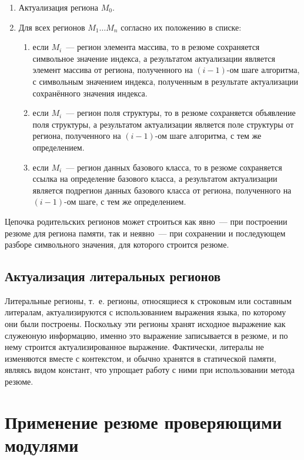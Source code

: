 \begin{enumerate}
 \item Актуализация региона $M_0$.
 \item Для всех регионов $M_1 \ldots M_n$ согласно их положению в списке:
 \begin{enumerate}
  \item если $M_i$~--- регион элемента массива, то в резюме сохраняется символьное значение индекса, а результатом актуализации является элемент массива от региона, полученного на $(i-1)$-ом шаге алгоритма, с символьным значением индекса, полученным в результате актуализации сохранённого значения индекса.
  \item если $M_i$~--- регион поля структуры, то в резюме сохраняется объявление поля структуры, а результатом актуализации является поле структуры от региона, полученного на $(i-1)$-ом шаге алгоритма, с тем же определением.
  \item если $M_i$~--- регион данных базового класса, то в резюме сохраняется ссылка на определение базового класса, а результатом актуализации является подрегион данных базового класса от региона, полученного на $(i-1)$-ом шаге, с тем же определением.
 \end{enumerate}
\end{enumerate}

Цепочка родительских регионов может строиться как явно~--- при построении резюме для региона памяти, так и неявно~--- при сохранении и последующем разборе символьного значения, для которого строится резюме.

\subsection{Актуализация литеральных регионов}

Литеральные регионы, т.~е. регионы, относящиеся к строковым или составным литералам, актуализируются с использованием выражения языка, по которому они были построены. Поскольку эти регионы хранят исходное выражение как служеюную информацию, именно это выражение записывается в резюме, и по нему строится актуализированное выражение. Фактически, литералы не изменяются вместе с контекстом, и обычно хранятся в статической памяти, являясь видом констант, что упрощает работу с ними при использовании метода резюме.

\section{Применение резюме проверяющими модулями}

